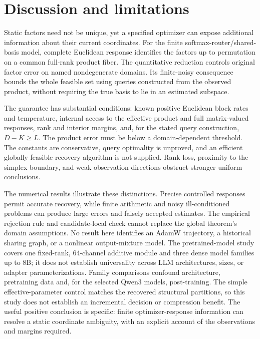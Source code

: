 \section{Discussion and limitations}

Static factors need not be unique, yet a specified optimizer can expose
additional information about their current coordinates. For the finite
softmax-router/shared-basis model, complete Euclidean response identifies
the factors up to permutation on a common full-rank product fiber.
The quantitative reduction controls original factor error on named
nondegenerate domains. Its finite-noisy consequence bounds the whole
feasible set using queries constructed from the observed product, without
requiring the true basis to lie in an estimated subspace.

The guarantee has substantial conditions: known positive Euclidean block
rates and temperature, internal access to the effective product and full
matrix-valued responses, rank and interior margins, and, for the stated
query construction, $D-K\ge L$. The product error must be below a
domain-dependent threshold. The constants are conservative, query
optimality is unproved, and an efficient globally feasible recovery
algorithm is not supplied. Rank loss, proximity to the simplex boundary,
and weak observation directions obstruct stronger uniform conclusions.

The numerical results illustrate these distinctions. Precise controlled
responses permit accurate recovery, while finite arithmetic and noisy
ill-conditioned problems can produce large errors and falsely accepted
estimates. The empirical rejection rule and candidate-local check cannot
replace the global theorem's domain assumptions. No result here identifies
an AdamW trajectory, a historical sharing graph, or a nonlinear
output-mixture model. The pretrained-model study covers one fixed-rank,
64-channel additive module and three dense model families up to 8B;
it does not establish universality across LLM architectures, sizes, or
adapter parameterizations. Family comparisons confound architecture,
pretraining data and, for the selected Qwen3 models, post-training.
The simple effective-parameter control matches the recovered structural
partitions, so this study does not establish an incremental decision or
compression benefit. The useful positive conclusion is specific: finite
optimizer-response information can resolve a static coordinate ambiguity,
with an explicit account of the observations and margins required.
